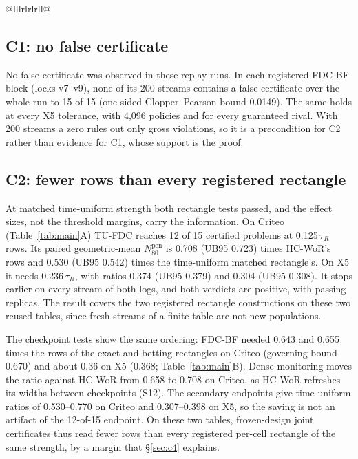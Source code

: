 \documentclass[sigconf,anonymous,review]{acmart}
\newcommand{\Npen}{N_{80}^{\text{pen}}}
\begin{document}
\begin{table}[t]
\begin{tabular}{@{}lllrlrlrll@{}}
\midrule
{} \\
\bottomrule
\end{tabular}
\end{table}

\subsection{C1: no false certificate}\label{sec:c1}

No false certificate was observed in these replay runs. In each registered FDC-BF block (locks v7--v9), none of its 200 streams contains a false certificate over the whole run to 15 of 15 (one-sided Clopper--Pearson bound 0.0149). The same holds at every X5 tolerance, with 4,096 policies and for every guaranteed rival. With 200 streams a zero rules out only gross violations, so it is a precondition for C2 rather than evidence for C1, whose support is the proof.

\subsection{C2: fewer rows than every registered rectangle}\label{sec:c2}

At matched time-uniform strength both rectangle tests passed, and the effect sizes, not the threshold margins, carry the information. On Criteo (Table~\ref{tab:main}A) TU-FDC reaches 12 of 15 certified problems at 0.125\,$\tau_R$ rows. Its paired geometric-mean $\Npen$ is 0.708 (UB95 0.723) times HC-WoR's rows and 0.530 (UB95 0.542) times the time-uniform matched rectangle's. On X5 it needs 0.236\,$\tau_R$, with ratios 0.374 (UB95 0.379) and 0.304 (UB95 0.308). It stops earlier on every stream of both logs, and both verdicts are positive, with passing replicas. The result covers the two registered rectangle constructions on these two reused tables, since fresh streams of a finite table are not new populations.

The checkpoint tests show the same ordering: FDC-BF needed 0.643 and 0.655 times the rows of the exact and betting rectangles on Criteo (governing bound 0.670) and about 0.36 on X5 (0.368; Table~\ref{tab:main}B). Dense monitoring moves the ratio against HC-WoR from 0.658 to 0.708 on Criteo, as HC-WoR refreshes its widths between checkpoints (S12). The secondary endpoints give time-uniform ratios of 0.530--0.770 on Criteo and 0.307--0.398 on X5, so the saving is not an artifact of the 12-of-15 endpoint. On these two tables, frozen-design joint certificates thus read fewer rows than every registered per-cell rectangle of the same strength, by a margin that \S\ref{sec:c4} explains.
\end{document}

